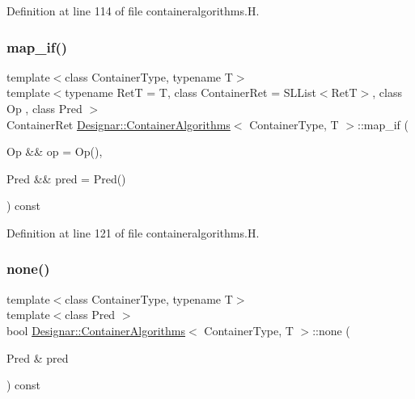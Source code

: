 Definition at line 114 of file containeralgorithms.\+H.

\mbox{\label{class_designar_1_1_container_algorithms_a23ffa9f0af79826db5a8dc04837f9617}} 
\subsubsection{\texorpdfstring{map\+\_\+if()}{map\_if()}\hspace{0.1cm}{\footnotesize\ttfamily [4/4]}}
{\footnotesize\ttfamily template$<$class Container\+Type, typename T$>$ \\
template$<$typename RetT  = T, class Container\+Ret  = S\+L\+List$<$\+Ret\+T$>$, class Op , class Pred $>$ \\
Container\+Ret \hyperlink{class_designar_1_1_container_algorithms}{Designar\+::\+Container\+Algorithms}$<$ Container\+Type, T $>$\+::map\+\_\+if (\begin{DoxyParamCaption}\item[{Op \&\&}]{op = {\ttfamily Op()},  }\item[{Pred \&\&}]{pred = {\ttfamily Pred()} }\end{DoxyParamCaption}) const\hspace{0.3cm}{\ttfamily [inline]}}



Definition at line 121 of file containeralgorithms.\+H.

\mbox{\label{class_designar_1_1_container_algorithms_aa91fe441074d132067cb5a3ad7870dc5}} 
\subsubsection{\texorpdfstring{none()}{none()}\hspace{0.1cm}{\footnotesize\ttfamily [1/2]}}
{\footnotesize\ttfamily template$<$class Container\+Type, typename T$>$ \\
template$<$class Pred $>$ \\
bool \hyperlink{class_designar_1_1_container_algorithms}{Designar\+::\+Container\+Algorithms}$<$ Container\+Type, T $>$\+::none (\begin{DoxyParamCaption}\item[{Pred \&}]{pred }\end{DoxyParamCaption}) const\hspace{0.3cm}{\ttfamily [inline]}}



